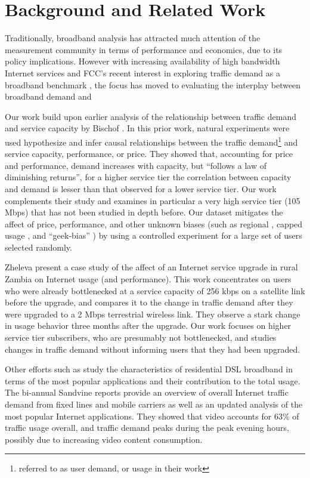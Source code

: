 \section{Background and Related Work}\label{sec:related}

Traditionally, broadband analysis has attracted much attention of the 
measurement community in terms of performance and economics, due to its policy 
implications. However with increasing availability of high bandwidth Internet 
services and FCC's recent interest in exploring traffic demand as a broadband 
benchmark \cite{fcc2015progress-report}, the focus has moved to evaluating the 
interplay between broadband demand and 

Our work build upon earlier analysis of the 
relationship between traffic demand and service capacity by Bischof \ea 
\cite{dasu-imc2014}. In this prior work, natural experiments were used 
hypothesize and infer causal relationships between the traffic 
demand\footnote{referred to as user demand, or usage in their work} and service 
capacity, performance, or price. They showed that, accounting for price and 
performance, demand increases with capacity, but ``follows a law of diminishing 
returns'', \ie for a higher service tier the correlation between capacity and 
demand is lesser than that observed for a lower service tier. Our work 
complements their study and examines in particular a very high service tier (105 
Mbps) that has not been studied in depth before. Our dataset mitigates the 
affect of price, performance, and other unknown biases (such as regional 
\cite{weather, region}, capped usage \cite{}, and ``geek-bias'' \cite{}) by 
using a controlled experiment for a large set of users selected randomly.

Zheleva \ea present a case study of the affect of an Internet service 
upgrade in rural Zambia on Internet usage (and performance). This work 
concentrates on users who were already bottlenecked at a service capacity 
of 256 kbps on a satellite link before the upgrade, and compares it to the 
change in traffic demand after they were upgraded to a 2 Mbps terrestrial 
wireless link. They observe a stark change in usage behavior three months 
after the upgrade. Our work focuses on higher service tier subscribers, who are 
presumably not bottlenecked, and studies changes in traffic demand without 
informing users that they had been upgraded.

Other efforts such as \cite{imc102-maier} study the characteristics of 
residential DSL broadband in terms of the most popular applications and their 
contribution to the total usage.
The bi-annual Sandvine reports \cite{sandvine2014report1h, 
sandvine2014report2h} provide an overview of overall Internet traffic 
demand from fixed lines and mobile carriers as well as an updated analysis of 
the most popular Internet applications. They showed that video accounts for 63\%
of traffic usage overall, and traffic demand peaks during the peak evening 
hours, possibly due to increasing video content consumption.

